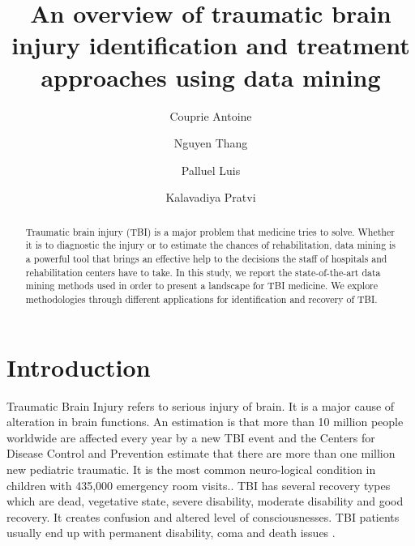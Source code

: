 \documentclass[runningheads]{llncs}
\begin{document}
\title{An overview of traumatic brain injury identification and treatment approaches using data mining}

\author{Couprie Antoine \and
Nguyen Thang \and
Palluel Luis \and
Kalavadiya Pratvi}


\maketitle

\begin{abstract}
Traumatic brain injury (TBI) is a major problem that medicine tries to solve. Whether it is to diagnostic the injury or to estimate the chances of rehabilitation, data mining is a powerful tool that brings an effective help to the decisions the staff of hospitals and rehabilitation centers have to take. In this study, we report the state-of-the-art data mining methods used in order to present a landscape for TBI medicine. We explore methodologies through different applications for identification and recovery of TBI.

\end{abstract}

\section{Introduction}

Traumatic Brain Injury refers to serious injury of brain. It is a major cause of alteration in brain functions. An estimation is that more than 10 million people worldwide are affected every year by a new TBI event \cite{alanazi_predicting_2016} and the Centers for Disease Control and Prevention estimate that there are more than one million new pediatric traumatic. It is the most common neuro-logical condition in children with 435,000 emergency room visits.\cite{wozniak_neurocognitive_2007}.
TBI has several recovery types which are dead, vegetative state, severe disability, moderate disability and good recovery. It creates confusion and altered level of consciousnesses. TBI patients usually end up with permanent disability, coma and death issues \cite{alanazi_predicting_2016}.
\end{document}
